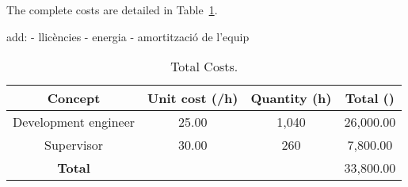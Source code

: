 

The complete costs are detailed in Table~\ref{tab:equip}.

add:
- llicències
- energia 
- amortització de l'equip


\begin{table}[!htb]\centering
	\caption{Total Costs.}
	\begin{tabular}{ccc|c}
		\hline
		\textbf{Concept} & \textbf{Unit cost (\texteuro/h)} & \textbf{Quantity (h)} & \textbf{Total (\texteuro)} \\
		\hline
		\hline
		Development engineer & 25.00 & 1,040 & 26,000.00 \\ 
		Supervisor & 30.00 & 260 & 7,800.00 \\
		\hline
		\textbf{Total} & & & 33,800.00 \\
		\hline
	\end{tabular}
	\label{tab:equip}
\end{table}


